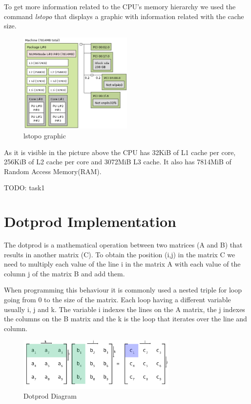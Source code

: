 \documentclass[a4paper]{report}
\begin{document}
To get more information related to the CPU's memory hierarchy we used the
command \textit{lstopo} that displays a graphic with information related with
the cache size.
\begin{figure}[H]
    \centering
        \includegraphics[width=0.5\textwidth]{images/lstopo.png}
        \caption{lstopo graphic}
\end{figure}

As it is visible in the picture above the CPU has 32KiB of L1 cache per core,
256KiB of L2 cache per core and 3072MiB L3 cache. It also has 7814MiB of Random
Access Memory(RAM).

TODO: task1

\chapter{Dotprod Implementation}
The dotprod is a mathematical operation between two matrices (A and B) that
results in another matrix (C). To obtain the position (i,j) in the matrix C we
need to multiply each value of the line i in the matrix A with each value of the
column j of the matrix B and add them.

When programming this behaviour it is commonly used a nested triple for loop
going from 0 to the size of the matrix. Each loop having a different variable
usually i, j and k. The variable i indexes the lines on the A matrix, the j
indexes the columns on the B matrix and the k is the loop that iterates over the
line and column.

\begin{figure}[H]
    \centering
        \includegraphics[width=0.7\textwidth]{images/matrix_mult.png}
        \caption{Dotprod Diagram}
\end{figure}
\end{document}
